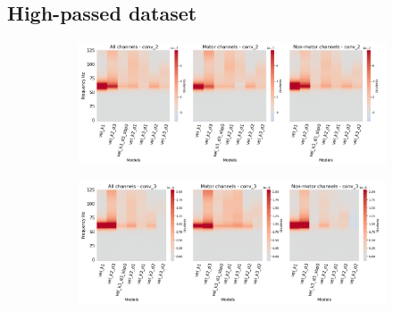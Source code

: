 \subsection*{High-passed dataset}\label{subsec:vel-high-passed-dataset-appendixA}
\begin{figure}[!htb]
\centering
\begin{subfigure}[a]{\textwidth}
   \includegraphics[width=0.9\linewidth]{img/appendix/A/conv-2/hp-m/vel-model-gradients_all_kinds}
   \caption{}
   \label{fig:vel-hp-grads-conv-2}
\end{subfigure}

\begin{subfigure}[b]{\textwidth}
   \includegraphics[width=0.9\linewidth]{img/appendix/A/conv-3/hp-m/vel-model-gradients_all_kinds}
   \caption{}
   \label{fig:vel-hp-grads-conv-3}
\end{subfigure}
\end{figure}
\clearpage   

